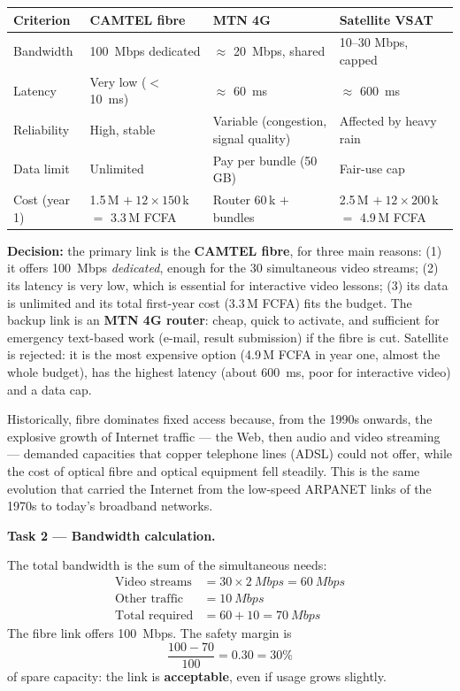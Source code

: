 \documentclass[11pt]{article}
\newcommand{\cle}[1]{{\popxbold\color{popdark}#1}}
\begin{document}
\begin{center}
\begin{tabularx}{\linewidth}{|l|X|X|X|}
\hline
\rowcolor{popblueL} \textbf{Criterion} & \textbf{CAMTEL fibre} & \textbf{MTN 4G} & \textbf{Satellite VSAT} \\
\hline
Bandwidth & \SI{100}{Mbps} dedicated & $\approx$ \SI{20}{Mbps}, shared & 10--30 Mbps, capped \\
\hline
Latency & Very low ($<$ \SI{10}{ms}) & $\approx$ \SI{60}{ms} & $\approx$ \SI{600}{ms} \\
\hline
Reliability & High, stable & Variable (congestion, signal quality) & Affected by heavy rain \\
\hline
Data limit & Unlimited & Pay per bundle (50\,GB) & Fair-use cap \\
\hline
Cost (year 1) & 1.5\,M $+\ 12\times 150$\,k $=$ 3.3\,M FCFA & Router 60\,k $+$ bundles & 2.5\,M $+\ 12\times 200$\,k $=$ 4.9\,M FCFA \\
\hline
\end{tabularx}
\end{center}

\textbf{Decision:} the \cle{primary link} is the \textbf{CAMTEL fibre}, for three main reasons: (1) it offers \SI{100}{Mbps} \emph{dedicated}, enough for the 30 simultaneous video streams; (2) its latency is very low, which is essential for interactive video lessons; (3) its data is unlimited and its total first-year cost (3.3\,M FCFA) fits the budget. The \cle{backup link} is an \textbf{MTN 4G router}: cheap, quick to activate, and sufficient for emergency text-based work (e-mail, result submission) if the fibre is cut. Satellite is rejected: it is the most expensive option (4.9\,M FCFA in year one, almost the whole budget), has the highest latency (about \SI{600}{ms}, poor for interactive video) and a data cap.

Historically, fibre dominates fixed access because, from the 1990s onwards, the explosive growth of Internet traffic — the Web, then audio and video streaming — demanded capacities that copper telephone lines (ADSL) could not offer, while the cost of optical fibre and optical equipment fell steadily. This is the same evolution that carried the Internet from the low-speed ARPANET links of the 1970s to today's broadband networks.

\textbf{Task 2 — Bandwidth calculation.}\par
The total bandwidth is the sum of the simultaneous needs:
\begin{align*}
\text{Video streams} &= 30 \times \SI{2}{Mbps} = \SI{60}{Mbps}\\
\text{Other traffic} &= \SI{10}{Mbps}\\
\text{Total required} &= 60 + 10 = \SI{70}{Mbps}
\end{align*}
The fibre link offers \SI{100}{Mbps}. The safety margin is
\[
\frac{100 - 70}{100} = 0.30 = 30\%
\]
of spare capacity: the link is \textbf{acceptable}, even if usage grows slightly.
\end{document}
